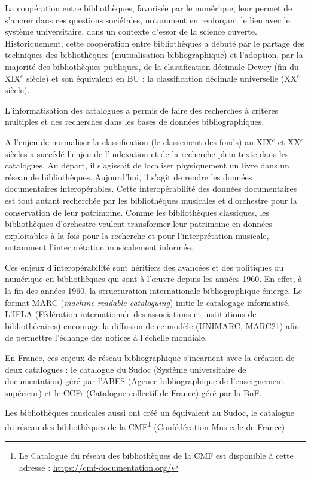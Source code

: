 La coopération entre bibliothèques, favorisée par le numérique, leur permet de s’ancrer dans ces questions sociétales, notamment en renforçant le lien avec le système universitaire, dans un contexte d’essor de la science ouverte. Historiquement, cette coopération entre bibliothèques a débuté par le partage des techniques des bibliothèques (mutualisation bibliographique) et l’adoption, par la majorité des bibliothèques publiques, de la classification décimale Dewey (fin du XIX$^{e}$ siècle) et son équivalent en BU : la classification décimale universelle (XX$^{e}$ siècle). 

L’informatisation des catalogues a permis de faire des recherches à critères multiples et des recherches dans les bases de données bibliographiques. 

A l’enjeu de normaliser la classification (le classement des fonds) au XIX$^{e}$ et XX$^{e}$ siècles a succédé l’enjeu de l’indexation et de la recherche plein texte dans les catalogues.  
Au départ, il s’agissait de localiser physiquement un livre dans un réseau de bibliothèques. Aujourd’hui, il s’agit de rendre les données documentaires interopérables. 
Cette interopérabilité des données documentaires est tout autant recherchée par les bibliothèques musicales et d'orchestre pour la conservation de leur patrimoine. Comme les bibliothèques classiques, les bibliothèques d'orchestre veulent transformer leur patrimoine en données exploitables à la fois pour la recherche et pour l'interprétation musicale, notamment l'interprétation musicalement informée. 

Ces enjeux d'interopérabilité sont héritiers des avancées et des politiques du numérique en bibliothèques qui sont à l'œuvre depuis les années 1960. 
En effet, à  la fin des années 1960, la structuration internationale bibliographique émerge. Le format MARC (\textit{machine readable cataloguing}) initie le catalogage informatisé. L’IFLA (Fédération internationale des associations et institutions de bibliothécaires) encourage la diffusion de ce modèle (UNIMARC, MARC21) afin de permettre l’échange des notices à l’échelle mondiale. 

En France, ces enjeux de réseau bibliographique s’incarnent avec la création de deux catalogues : le catalogue du Sudoc  (Système universitaire de documentation) géré par
l’ABES (Agence bibliographique de l’enseignement supérieur) et le CCFr (Catalogue collectif de France) géré par la BnF.

Les bibliothèques musicales aussi ont créé un équivalent au Sudoc, le catalogue du réseau des bibliothèques de la CMF\footnote{Le Catalogue du réseau des bibliothèques de la CMF est disponible à cette adresse : \url{https://cmf-documentation.org/}} (Confédération Musicale de France)

